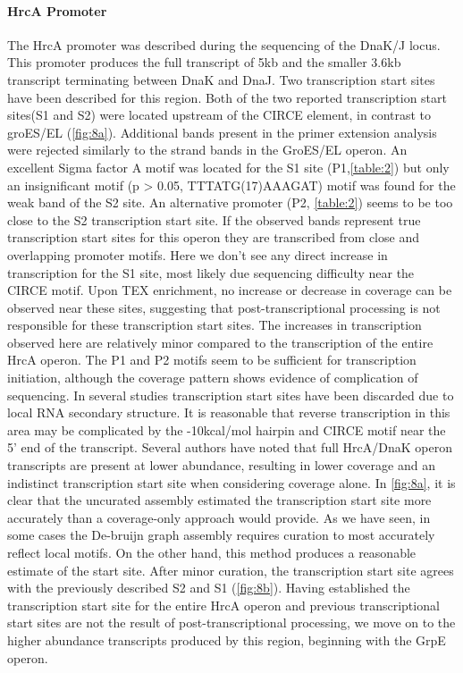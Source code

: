 \paragraph{HrcA Promoter}
The HrcA promoter was described during the sequencing of the DnaK/J locus\cite{79}. This promoter produces the full transcript of 5kb and the smaller 3.6kb transcript terminating between DnaK and DnaJ. Two transcription start sites have been described for this region\cite{79}. Both of the two reported transcription start sites(S1 and S2) were located upstream of the CIRCE element, in contrast to groES/EL (\ref{fig:8a}). Additional bands present in the primer extension analysis were rejected similarly to the strand bands in the GroES/EL operon. An excellent Sigma factor A motif was located for the S1 site (P1,\ref{table:2}) but only an insignificant motif (p > 0.05, TTTATG(17)AAAGAT) motif was found for the weak band of the S2 site. An alternative promoter (P2, \ref{table:2}) seems to be too close to the S2 transcription start site. If the observed bands represent true transcription start sites for this operon they are transcribed from close and overlapping promoter motifs. Here we don't see any direct increase in transcription for the S1 site, most likely due sequencing difficulty near the CIRCE motif. Upon TEX enrichment, no increase or decrease in coverage can be observed near these sites, suggesting that post-transcriptional processing is not responsible for these transcription start sites. The increases in transcription observed here are relatively minor compared to the transcription of the entire HrcA operon. The P1 and P2 motifs seem to be sufficient for transcription initiation, although the coverage pattern shows evidence of complication of sequencing. In several studies\cite{75,79} transcription start sites have been discarded due to local RNA secondary structure. It is reasonable that reverse transcription in this area may be complicated by the -10kcal/mol hairpin and CIRCE motif near the 5' end of the transcript. Several authors have noted that full HrcA/DnaK operon transcripts are present at lower abundance\cite{79,82}, resulting in lower coverage and an indistinct transcription start site when considering coverage alone. In \ref{fig:8a}, it is clear that the uncurated assembly estimated the transcription start site more accurately than a coverage-only approach would provide. As we have seen, in some cases the De-bruijn graph assembly requires curation to most accurately reflect local motifs. On the other hand, this method produces a reasonable estimate of the start site. After minor curation, the transcription start site agrees with the previously described\cite{79} S2 and S1 (\ref{fig:8b}). Having established the transcription start site for the entire HrcA operon and previous transcriptional start sites are not the result of post-transcriptional processing, we move on to the higher abundance transcripts produced by this region, beginning with the GrpE operon.

